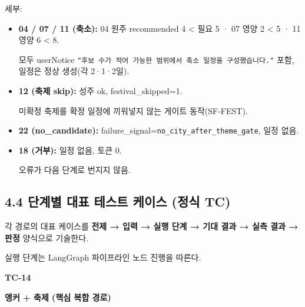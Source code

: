 \documentclass[12pt,a4paper]{article}
\newcommand{\DocNeedspace}[1]{\par\ifdim\dimexpr\pagegoal-\pagetotal\relax<#1\newpage\fi}
\providecommand{\tightlist}{\setlength{\itemsep}{0pt}\setlength{\parskip}{0pt}}
\begin{document}
세부:

\begin{itemize}
\tightlist
\item
  \textbf{04 / 07 / 11 (축소):} 04 원주 recommended 4 \textless{} 필요 5 · 07 영양 2 \textless{} 5 · 11 영양 6 \textless{} 8.\par\noindent
  모두 userNotice \texttt{"후보\ 수가\ 적어\ 가능한\ 범위에서\ 축소\ 일정을\ 구성했습니다.\allowbreak{}"} 포함, 일정은 정상 생성(각 2·1·2일).
\item
  \textbf{12 (축제 skip):} 성주 ok, festival\_skipped=1.\par\noindent
  미확정 축제를 확정 일정에 끼워넣지 않는 게이트 동작(SF-FEST).
\item
  \textbf{22 (no\_candidate):} failure\_signal=\texttt{no\_\allowbreak{}city\_\allowbreak{}after\_\allowbreak{}theme\_\allowbreak{}gate}, 일정 없음.
\item
  \textbf{18 (거부):} 일정 없음, 토큰 0.\par\noindent
  오류가 다음 단계로 번지지 않음.
\end{itemize}

\DocNeedspace{6\baselineskip}
\subsection*{4.4 단계별 대표 테스트 케이스 (정식 TC)}

각 경로의 대표 케이스를 \textbf{전제 → 입력 → 실행 단계 → 기대 결과 → 실측 결과 → 판정} 양식으로 기술한다.
\par\noindent 실행 단계는 LangGraph 파이프라인 노드 진행을 따른다.

\textbf{TC-14}\par\noindent
\textbf{앵커 + 축제 (핵심 복합 경로)}
\end{document}
